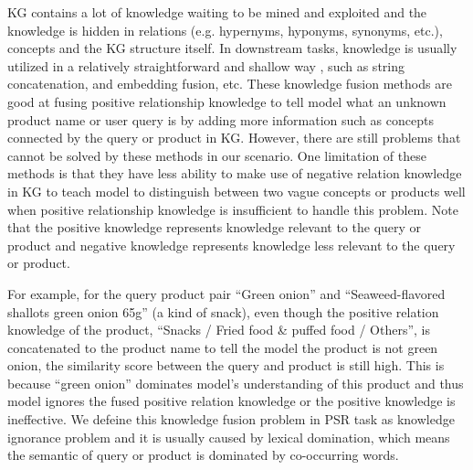 



KG contains a lot of knowledge waiting to be mined and exploited and the knowledge is hidden in relations (e.g. hypernyms, hyponyms, synonyms, etc.), concepts and the KG structure itself. 
In downstream tasks, knowledge is usually utilized in a relatively straightforward and shallow way \cite{bian2021benchmarking, luo2020alicoco, luo2021alicoco2, zhang2021enriching}, such as string concatenation, and embedding fusion, etc. 
These knowledge fusion methods are good at fusing positive relationship knowledge to tell model what an unknown product name or user query is by adding more information such as concepts connected by the query or product in KG.
However, there are still problems that cannot be solved by these methods in our scenario. 
One limitation of these methods is that they have less ability to make use of negative relation knowledge in KG to teach model to distinguish between two vague concepts or products well when positive relationship knowledge is insufficient to handle this problem. 
Note that the positive knowledge represents knowledge relevant to the query or product and negative knowledge represents knowledge less relevant to the query or product. 

For example, for the query product pair ``Green onion'' and ``Seaweed-flavored shallots green onion 65g'' (a kind of snack), even though the positive relation knowledge of the product, ``Snacks / Fried food \& puffed food / Others'', is concatenated to the product name to tell the model the product is not green onion, the similarity score between the query and product is still high. 
This is because ``green onion'' dominates model's understanding of this product and thus model ignores the fused positive relation knowledge or the positive knowledge is ineffective.
We defeine this knowledge fusion problem in PSR task as knowledge ignorance problem and it is usually caused by lexical domination, which means the semantic of query or product is dominated by co-occurring words.


